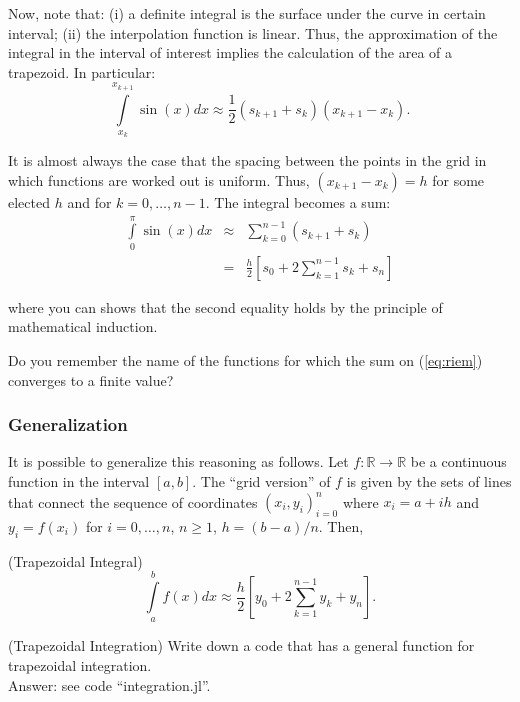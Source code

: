 \indent Now, note that: (i) a definite integral is the surface under the curve in certain interval; (ii) the interpolation function is linear. Thus, the approximation of the integral in the interval of interest implies the calculation of the area of a trapezoid. In particular:
\begin{equation}
\int \limits _{x_{k}} ^{x_{k+1}} \sin(x)dx \approx \frac{1}{2} (s_{k+1} + s_{k})(x_{k+1} - x_{k}).
\end{equation}

\indent It is almost always the case that the spacing between the points in the grid in which functions are worked out is uniform. Thus, $(x_{k+1} - x_{k}) = h$ for some elected $h$ and for $k = 0, \ldots, n-1$. The integral becomes a sum:
\begin{eqnarray}
\int \limits _{0} ^{\pi} \sin(x)dx &\approx& \sum \limits _{k=0} ^{n-1} (s_{k+1} +s_{k}) \\ \nonumber
&=& \frac{h}{2} \left[ s_{0} + 2 \sum \limits _{k=1} ^{n-1} s_{k} + s_{n}  \right] \label{eq:riem}
\end{eqnarray}

\noindent where you can shows that the second equality holds by the principle of mathematical induction.

\begin{clue}
Do you remember the name of the functions for which the sum on (\ref{eq:riem}) converges to a finite value?
\end{clue}

\subsubsection{Generalization} \label{section:gen}
It is possible to generalize this reasoning as follows. Let $f: \mathbb{R} \rightarrow \mathbb{R}$ be a continuous function in the interval $[a,b]$. The ``grid version'' of $f$ is given by the sets of lines that connect the sequence of coordinates $(x_{i},y_{i})_{i=0}^{n}$ where $x_{i} = a + ih$ and $y_{i} = f(x_{i})$ for $i = 0, \ldots, n$, $n \geq 1$, $h = (b-a)/n$. Then,
\begin{definition} (Trapezoidal Integral)
\begin{equation}
\int \limits _{a} ^{b} f(x)dx \approx \frac{h}{2} \left[ y_{0} + 2 \sum \limits _{k=1} ^{n-1} y_{k} + y_{n}  \right].
\end{equation}
\end{definition}

\begin{exercise} (Trapezoidal Integration) \label{exercise:trap}
Write down a code that has a general function for trapezoidal integration.\\
\noindent Answer: see code ``integration.jl''.
\end{exercise}



